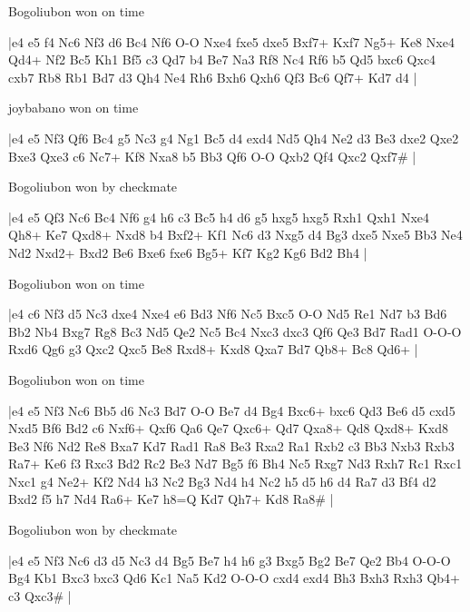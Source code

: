 \showboard

Bogoliubon won on time

\makegametitle
|e4 e5 f4 Nc6 Nf3 d6 Bc4 Nf6 O-O Nxe4 fxe5 dxe5 Bxf7+ Kxf7 Ng5+ Ke8 Nxe4 Qd4+ Nf2 Bc5 Kh1 Bf5 c3 Qd7 b4 Be7 Na3 Rf8 Nc4 Rf6 b5 Qd5 bxc6 Qxc4 cxb7 Rb8 Rb1 Bd7 d3 Qh4 Ne4 Rh6 Bxh6 Qxh6 Qf3 Bc6 Qf7+ Kd7 d4  |

\showboard

joybabano won on time

\makegametitle
|e4 e5 Nf3 Qf6 Bc4 g5 Nc3 g4 Ng1 Bc5 d4 exd4 Nd5 Qh4 Ne2 d3 Be3 dxe2 Qxe2 Bxe3 Qxe3 c6 Nc7+ Kf8 Nxa8 b5 Bb3 Qf6 O-O Qxb2 Qf4 Qxc2 Qxf7\#  |

\showboard

Bogoliubon won by checkmate

\makegametitle
|e4 e5 Qf3 Nc6 Bc4 Nf6 g4 h6 c3 Bc5 h4 d6 g5 hxg5 hxg5 Rxh1 Qxh1 Nxe4 Qh8+ Ke7 Qxd8+ Nxd8 b4 Bxf2+ Kf1 Nc6 d3 Nxg5 d4 Bg3 dxe5 Nxe5 Bb3 Ne4 Nd2 Nxd2+ Bxd2 Be6 Bxe6 fxe6 Bg5+ Kf7 Kg2 Kg6 Bd2 Bh4  |

\showboard

Bogoliubon won on time

\makegametitle
|e4 c6 Nf3 d5 Nc3 dxe4 Nxe4 e6 Bd3 Nf6 Nc5 Bxc5 O-O Nd5 Re1 Nd7 b3 Bd6 Bb2 Nb4 Bxg7 Rg8 Bc3 Nd5 Qe2 Nc5 Bc4 Nxc3 dxc3 Qf6 Qe3 Bd7 Rad1 O-O-O Rxd6 Qg6 g3 Qxc2 Qxc5 Be8 Rxd8+ Kxd8 Qxa7 Bd7 Qb8+ Bc8 Qd6+  |

\showboard

Bogoliubon won on time

\makegametitle
|e4 e5 Nf3 Nc6 Bb5 d6 Nc3 Bd7 O-O Be7 d4 Bg4 Bxc6+ bxc6 Qd3 Be6 d5 cxd5 Nxd5 Bf6 Bd2 c6 Nxf6+ Qxf6 Qa6 Qe7 Qxc6+ Qd7 Qxa8+ Qd8 Qxd8+ Kxd8 Be3 Nf6 Nd2 Re8 Bxa7 Kd7 Rad1 Ra8 Be3 Rxa2 Ra1 Rxb2 c3 Bb3 Nxb3 Rxb3 Ra7+ Ke6 f3 Rxc3 Bd2 Rc2 Be3 Nd7 Bg5 f6 Bh4 Nc5 Rxg7 Nd3 Rxh7 Rc1 Rxc1 Nxc1 g4 Ne2+ Kf2 Nd4 h3 Nc2 Bg3 Nd4 h4 Nc2 h5 d5 h6 d4 Ra7 d3 Bf4 d2 Bxd2 f5 h7 Nd4 Ra6+ Ke7 h8=Q Kd7 Qh7+ Kd8 Ra8\#  |

\showboard

Bogoliubon won by checkmate

\makegametitle
|e4 e5 Nf3 Nc6 d3 d5 Nc3 d4 Bg5 Be7 h4 h6 g3 Bxg5 Bg2 Be7 Qe2 Bb4 O-O-O Bg4 Kb1 Bxc3 bxc3 Qd6 Kc1 Na5 Kd2 O-O-O cxd4 exd4 Bh3 Bxh3 Rxh3 Qb4+ c3 Qxc3\#  |

